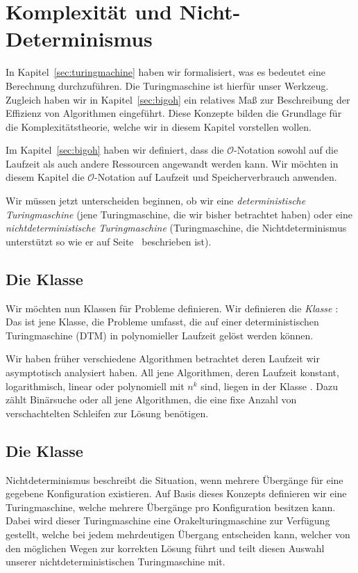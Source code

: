 \chapter{Komplexität und Nicht-Determinismus}
%
In Kapitel~\ref{sec:turingmachine} haben wir formalisiert, was es bedeutet eine Berechnung durchzuführen. Die Turingmaschine ist hierfür unser Werkzeug. Zugleich haben wir in Kapitel~\ref{sec:bigoh} ein relatives Maß zur Beschreibung der Effizienz von Algorithmen eingeführt. Diese Konzepte bilden die Grundlage für die Komplexitätstheorie, welche wir in diesem Kapitel vorstellen wollen.

Im Kapitel~\ref{sec:bigoh} haben wir definiert, dass die $\mathcal{O}$-Notation sowohl auf die Laufzeit als auch andere Ressourcen angewandt werden kann. Wir möchten in diesem Kapitel die $\mathcal{O}$-Notation auf Laufzeit und Speicherverbrauch anwenden.

Wir müssen jetzt unterscheiden beginnen, ob wir eine \emph{deterministische Turingmaschine} (jene Turingmaschine, die wir bisher betrachtet haben) oder eine \emph{nichtdeterministische Turingmaschine} (Turingmaschine, die Nichtdeterminismus unterstützt so wie er auf Seite~\pageref{sec:nondeterminism} beschrieben ist).

\section{Die Klasse \cP{}}
%
Wir möchten nun Klassen für Probleme definieren. Wir definieren die \emph{Klasse \cP{}}:
Das ist jene Klasse, die Probleme umfasst, die auf einer deterministischen Turingmaschine (DTM) in polynomieller Laufzeit gelöst werden können.

Wir haben früher verschiedene Algorithmen betrachtet deren Laufzeit wir asymptotisch analysiert haben. All jene Algorithmen, deren Laufzeit konstant, logarithmisch, linear oder polynomiell mit $n^k$ sind, liegen in der Klasse \cP{}. Dazu zählt Binärsuche oder all jene Algorithmen, die eine fixe Anzahl von verschachtelten Schleifen zur Lösung benötigen.

\section{Die Klasse \cNP{}}
%
Nichtdeterminismus beschreibt die Situation, wenn mehrere Übergänge für eine gegebene Konfiguration existieren. Auf Basis dieses Konzepts definieren wir eine Turingmaschine, welche mehrere Übergänge pro Konfiguration besitzen kann. Dabei wird dieser Turingmaschine eine Orakelturingmaschine zur Verfügung gestellt, welche bei jedem mehrdeutigen Übergang entscheiden kann, welcher von den möglichen Wegen zur korrekten Lösung führt und teilt diesen Auswahl unserer nichtdeterministischen Turingmaschine mit.

